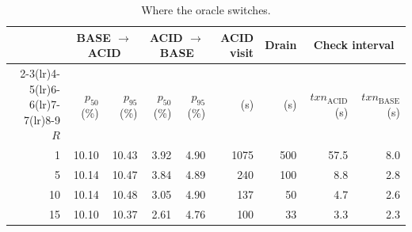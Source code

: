 \begin{table}[htbp]
  \centering
  \captionsetup{format=plain,justification=centering}
  \caption{Where the oracle switches.}
  \label{tab:effective-recovery}
  \small
  \setlength{\tabcolsep}{5pt}
  \begin{tabular}{r r r r r r r r r}
    \toprule
                                        & \multicolumn{2}{c}{BASE $\to$ ACID} &
    \multicolumn{2}{c}{ACID $\to$ BASE} & ACID visit                          &
    Drain                               & \multicolumn{2}{c}{Check interval}
    \\
    \cmidrule(lr){2-3}\cmidrule(lr){4-5}\cmidrule(lr){6-6}\cmidrule(lr){7-7}\cmidrule(lr){8-9}
    $R$                                 & $p_{50}$ (\%)                       &
    $p_{95}$ (\%)                       & $p_{50}$ (\%)
                                        & $p_{95}$ (\%)                       & (s)
                                        & (s)                                 & $txn_{\mathrm{ACID}}$ (s) & $txn_{\mathrm{BASE}}$ (s)
    \\
    \midrule
    1                                   & 10.10                               &
    10.43                               & 3.92
                                        & 4.90                                & 1075                      & 500
                                        & 57.5                                &
    8.0
    \\
    5                                   & 10.14                               &
    10.47                               & 3.84
                                        & 4.89                                & 240                       & 100
                                        & 8.8                                 &
    2.8
    \\
    10                                  & 10.14                               &
    10.48                               & 3.05
                                        & 4.90                                & 137                       & 50
                                        & 4.7                                 &
    2.6
    \\
    15                                  & 10.10                               &
    10.37                               & 2.61
                                        & 4.76                                & 100                       & 33
                                        & 3.3                                 &
    2.3
    \\
    \bottomrule
  \end{tabular}
\end{table}

